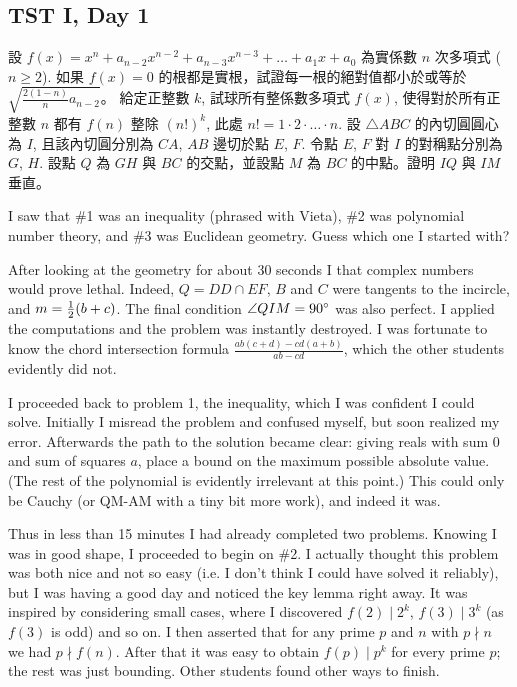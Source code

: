 \documentclass[11pt]{scrreprt}
\begin{document}
\subsection{TST I, Day 1}
\begin{enumerate}
  \ii 設 $f(x) = x^n + a_{n-2} x^{n-2} + a_{n-3}x^{n-3} + \dots + a_1 x + a_0$ 為實係數 $n$ 次多項式 ($n \ge 2$). 如果 $f(x) = 0$ 的根都是實根，試證每一根的絕對值都小於或等於 $\sqrt{\frac{2(1-n)}{n} a_{n-2}}$。
  \ii 給定正整數 $k$, 試球所有整係數多項式 $f(x)$, 使得對於所有正整數 $n$ 都有 $f(n)$ 整除 $(n!)^k$, 此處 $n! = 1 \cdot 2 \cdot \ldots \cdot n$.
  \ii 設 $\triangle ABC$ 的內切圓圓心為 $I$, 且該內切圓分別為 $CA$, $AB$ 邊切於點 $E$, $F$. 令點 $E$, $F$ 對 $I$ 的對稱點分別為 $G$, $H$.
  設點 $Q$ 為 $GH$ 與 $BC$ 的交點，並設點 $M$ 為 $BC$ 的中點。證明 $IQ$ 與 $IM$ 垂直。
\end{enumerate}
I saw that \#1 was an inequality (phrased with Vieta), \#2 was polynomial number theory,
and \#3 was Euclidean geometry. Guess which one I started with?

After looking at the geometry for about 30 seconds I that complex numbers would prove lethal.
Indeed, $Q = DD \cap EF$, $B$ and $C$ were tangents to the incircle, and $m = \frac{1}{2} (b+c)$.
The final condition $\angle QIM = 90^\circ$ was also perfect.
I applied the computations and the problem was instantly destroyed.
I was fortunate to know the chord intersection formula $\frac{ab(c+d)-cd(a+b)}{ab-cd}$,
which the other students evidently did not.

I proceeded back to problem 1, the inequality, which I was confident I could solve.
Initially I misread the problem and confused myself, but soon realized my error.
Afterwards the path to the solution became clear: giving reals with sum $0$ and sum of squares $a$,
place a bound on the maximum possible absolute value.
(The rest of the polynomial is evidently irrelevant at this point.) This could
only be Cauchy (or QM-AM with a tiny bit more work), and indeed it was.

Thus in less than 15 minutes I had already completed two problems.
Knowing I was in good shape, I proceeded to begin on \#2.
I actually thought this problem was both nice and not so easy ({i.e.} I don't
think I could have solved it reliably), but I was having a good day and noticed the key lemma right away.
It was inspired by considering small cases, where I discovered $f(2) \mid 2^k$,
$f(3) \mid 3^k$ (as $f(3)$ is odd) and so on.
I then asserted that for any prime $p$ and $n$ with $p \nmid n$ we had $p \nmid f(n)$.
After that it was easy to obtain $f(p) \mid p^k$ for every prime $p$; the rest was just bounding.
Other students found other ways to finish.
\end{document}
